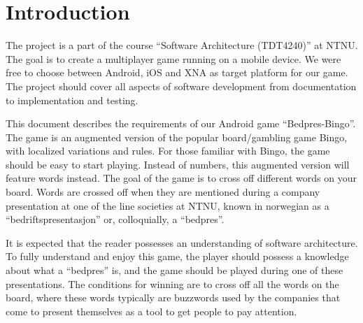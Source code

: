 \section{Introduction}
\label{sec:introduction}
The project is a part of the course ``Software Architecture (TDT4240)'' at NTNU. The goal is to create a multiplayer game running on a mobile device. We were free to choose between Android, iOS and XNA as target platform for our game. 
The project should cover all aspects of software development from documentation to implementation and testing. 

This document describes the requirements of our Android game ``Bedpres-Bingo''.
The game is an augmented version of the popular board/gambling game Bingo,
with localized variations and rules. For those familiar with Bingo,
the game should be easy to start playing. Instead of numbers, this augmented
version will feature words instead. The goal of the game is to cross off
different words on your board. Words are crossed off when they are mentioned
during a company presentation at one of the line societies at NTNU, known in
norwegian as a ``bedriftspresentasjon'' or, colloquially, a ``bedpres''.

It is expected that the reader possesses an understanding of software
architecture. To fully understand and enjoy this game, the player should
possess a knowledge about what a ``bedpres'' is, and the game should be played
during one of these presentations. The conditions for winning are to cross off
all the words on the board, where these words typically are buzzwords used by
the companies that come to present themselves as a tool to get people to pay
attention.
